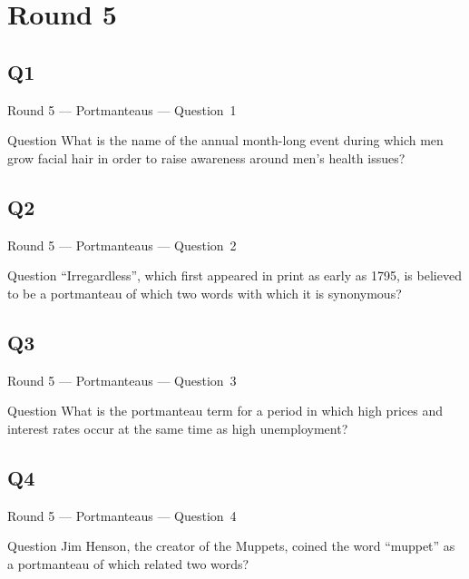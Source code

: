 \documentclass[11pt]{beamer}
\begin{document}
\section{Round 5}
\subsection*{Q1}
\begin{frame}[t]{Round 5 --- Portmanteaus --- \mbox{Question 1}}
\vspace{-0.5em}
\begin{block}{Question}
What is the name of the annual month-long event during which men grow facial hair in order to raise awareness around men's health issues?
\end{block}
\end{frame}
\subsection*{Q2}
\begin{frame}[t]{Round 5 --- Portmanteaus --- \mbox{Question 2}}
\vspace{-0.5em}
\begin{block}{Question}
``Irregardless'', which first appeared in print as early as 1795, is believed to be a portmanteau of which two words with which it is synonymous?
\end{block}
\end{frame}
\subsection*{Q3}
\begin{frame}[t]{Round 5 --- Portmanteaus --- \mbox{Question 3}}
\vspace{-0.5em}
\begin{block}{Question}
What is the portmanteau term for a period in which high prices and interest rates occur at the same time as high unemployment?
\end{block}
\end{frame}
\subsection*{Q4}
\begin{frame}[t]{Round 5 --- Portmanteaus --- \mbox{Question 4}}
\vspace{-0.5em}
\begin{block}{Question}
Jim Henson, the creator of the Muppets, coined the word ``muppet'' as a portmanteau of which related two words?
\end{block}
\end{frame}
\end{document}
